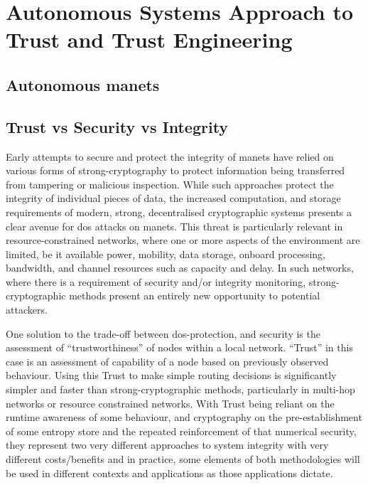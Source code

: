 \section{Autonomous Systems Approach to Trust and Trust Engineering}

\subsection{Autonomous \glspl{manet}}

\subsection{Trust vs Security vs Integrity}

Early attempts to secure and protect the integrity of \glspl{manet} have relied on various forms of strong-cryptography to protect information being transferred from tampering or malicious inspection.
While such approaches protect the integrity of individual pieces of data, the increased computation, and storage requirements of modern, strong, decentralised cryptographic systems presents a clear avenue for \gls{dos} attacks on \glspl{manet}.
This threat is particularly relevant in resource-constrained networks, where one or more aspects of the environment are limited, be it available power, mobility, data storage, onboard processing, bandwidth, and channel resources such as capacity and delay.
In such networks, where there is a requirement of security and/or integrity monitoring, strong-cryptographic methods present an entirely new opportunity to potential attackers.

One solution to the trade-off between \gls{dos}-protection, and security is the assessment of ``trustworthiness'' of nodes within a local network. 
``Trust'' in this case is an assessment of capability of a node based on previously observed behaviour.
Using this Trust to make simple routing decisions is significantly simpler and faster than strong-cryptographic methods, particularly in multi-hop networks or resource constrained networks\cite{Cordasco2008}.
With Trust being reliant on the runtime awareness of some behaviour, and cryptography on the pre-establishment of some entropy store and the repeated reinforcement of that numerical security, they represent two very different approaches to system integrity with very different costs/benefits and in practice, some elements of both methodologies will be used in different contexts and applications as those applications dictate.


